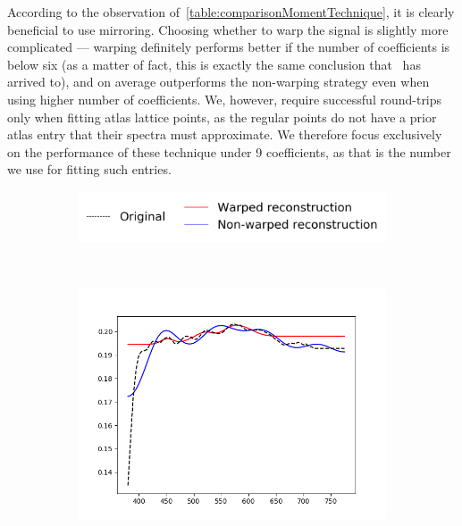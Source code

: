 According to the observation of~\cref{table:comparisonMomentTechnique}, it is clearly beneficial to use mirroring. Choosing whether to warp the signal is slightly more complicated --- warping definitely performs better if the number of coefficients is below six (as a matter of fact, this is exactly the same conclusion that~\citet{trigonometricMomentsPresentation} has arrived to), and on average outperforms the non-warping strategy even when using higher number of coefficients. We, however, require successful round-trips only when fitting atlas lattice points, as the regular points do not have a prior atlas entry that their spectra must approximate. We therefore focus exclusively on the performance of these technique under 9 coefficients, as that is the number we use for fitting such entries. 

\begin{figure}[t]
	\centering
	\captionsetup[subfigure]{font=footnotesize,labelfont=footnotesize}
	\captionsetup[subfigure]{justification=centering}
	\begin{subfigure}[t]{0.60\textwidth}
		\includegraphics[width=\linewidth]{img/results_techniqueLegend.png}
	\end{subfigure} \\
	\begin{subfigure}[t]{0.45\textwidth}
		\includegraphics[width=\linewidth]{img/results_techniqueNeutral5.png}

\end{subfigure}
\end{figure}
